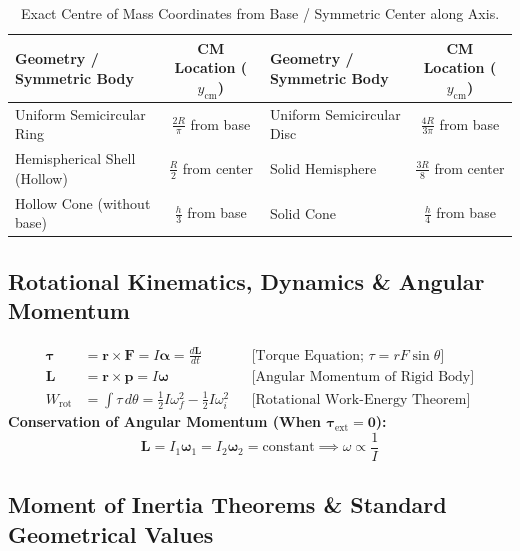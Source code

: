 \documentclass[11pt,a4paper]{article}
\begin{document}
\begin{table}[htbp]
\centering
\small
\renewcommand{\arraystretch}{1.2}
\begin{tabularx}{\textwidth}{L c L c}
\toprule
\textbf{Geometry / Symmetric Body} & \textbf{CM Location ($y_{\text{cm}}$)} & \textbf{Geometry / Symmetric Body} & \textbf{CM Location ($y_{\text{cm}}$)} \\
\midrule
Uniform Semicircular Ring & $\frac{2R}{\pi}$ from base & Uniform Semicircular Disc & $\frac{4R}{3\pi}$ from base \\
Hemispherical Shell (Hollow) & $\frac{R}{2}$ from center & Solid Hemisphere & $\frac{3R}{8}$ from center \\
Hollow Cone (without base) & $\frac{h}{3}$ from base & Solid Cone & $\frac{h}{4}$ from base \\
\bottomrule
\end{tabularx}
\caption{Exact Centre of Mass Coordinates from Base / Symmetric Center along Axis.}
\end{table}

\subsection{Rotational Kinematics, Dynamics \& Angular Momentum}

\begin{formulabox}
\begin{align}
  \boldsymbol{\tau} &= \mathbf{r} \times \mathbf{F} = I\boldsymbol{\alpha} = \frac{d\mathbf{L}}{dt} && \text{[Torque Equation; $\tau = r F \sin\theta$]} \\
  \mathbf{L} &= \mathbf{r} \times \mathbf{p} = I\boldsymbol{\omega} && \text{[Angular Momentum of Rigid Body]} \\
  W_{\text{rot}} &= \int \tau\,d\theta = \frac{1}{2}I\omega_f^2 - \frac{1}{2}I\omega_i^2 && \text{[Rotational Work-Energy Theorem]}
\end{align}
\textbf{Conservation of Angular Momentum (When $\boldsymbol{\tau}_{\text{ext}} = \mathbf{0}$):}
\begin{equation}
  \mathbf{L} = I_1 \boldsymbol{\omega}_1 = I_2 \boldsymbol{\omega}_2 = \text{constant} \implies \omega \propto \frac{1}{I}
\end{equation}
\end{formulabox}

\subsection{Moment of Inertia Theorems \& Standard Geometrical Values}
\end{document}
